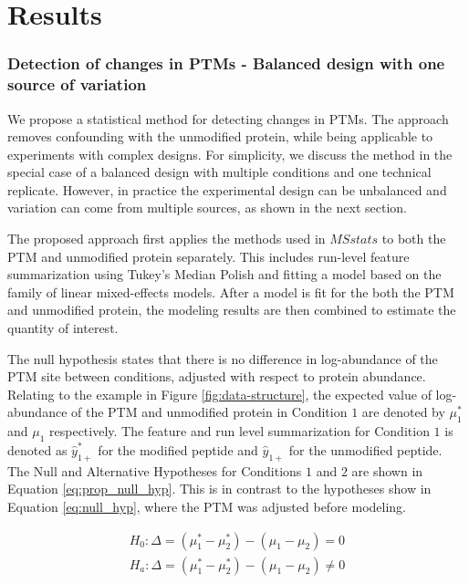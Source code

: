 \documentclass[mcp]{article}
\numberwithin{table}{section}
\begin{document}
\section*{Results}

\subsubsection*{Detection of changes in PTMs - Balanced design with one source of variation}
\label{sec:adjustment_summary}

We propose a statistical method for detecting changes in PTMs. The approach removes confounding with the unmodified protein, while being applicable to experiments with complex designs. For simplicity, we discuss the method in the special case of a balanced design with multiple conditions and one technical replicate. However, in  practice the experimental design can be unbalanced and variation can come from multiple sources, as shown in the next section.

The proposed approach first applies the methods used in $MSstats$ to both the PTM and unmodified protein separately. This includes run-level feature summarization using Tukey's Median Polish and fitting a model based on the family of linear mixed-effects models. After a model is fit for the both the PTM and unmodified protein, the modeling results are then combined to estimate the quantity of interest.

The null hypothesis states that there is no difference in log-abundance of the PTM site between conditions, adjusted with respect to protein abundance. Relating to the example in Figure \ref{fig:data-structure}, the expected value of log-abundance of the PTM and unmodified protein in Condition $1$ are denoted by $\mu_{1}^{\ast}$ and $\mu_{1}$ respectively. The feature and run level summarization for Condition $1$ is denoted as $\hat{y}_{1+}^{\ast}$ for the modified peptide and $\hat{y}_{1+}$ for the unmodified peptide. The Null and Alternative Hypotheses for Conditions $1$ and $2$ are shown in Equation \ref{eq:prop_null_hyp}. This is in contrast to the hypotheses show in Equation \ref{eq:null_hyp}, where the PTM was adjusted before modeling.

\begin{equation}
\begin{aligned}
H_{0}: \Delta = ( \mu_{1}^{\ast} - \mu_{2}^{\ast} ) - ( \mu_{1} - \mu_{2} ) = 0 \\
H_{a}: \Delta = ( \mu_{1}^{\ast} - \mu_{2}^{\ast} ) - ( \mu_{1} - \mu_{2} ) \neq 0
\end{aligned}
\label{eq:prop_null_hyp}
\end{equation}
\end{document}
